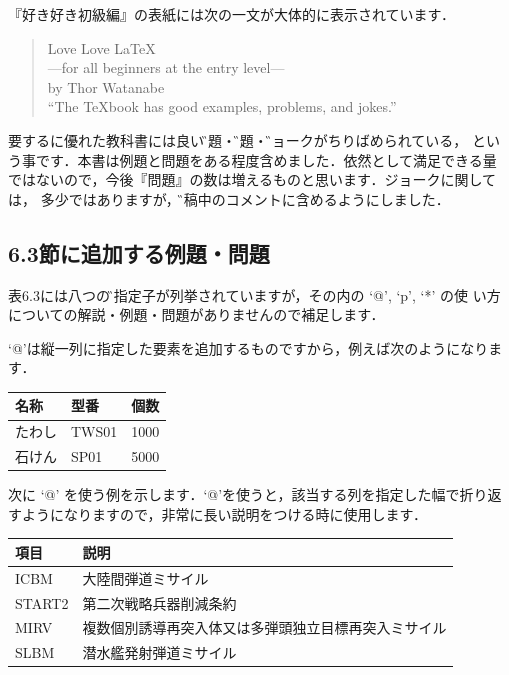 『好き好き\LaTeXe 初級編』の表紙には次の一文が大体的に表示されています．
\begin{quote}
\begin{center}
\begin{em}
 Love Love \LaTeX\\
 ---for all beginners at the entry level---\\
 by Thor Watanabe\\
 ``The \TeX book has good examples, problems, and jokes.''
\end{em}
\end{center}
\end{quote}
要するに優れた教科書には良い\G{例題}・\G{問題}・\G{ジョーク}がちりばめられている，
という事です．本書は例題と問題をある程度含めました．依然として満足できる量
ではないので，今後『問題』の数は増えるものと思います．ジョークに関しては，
多少ではありますが，\G{原稿中のコメント}に含めるようにしました．

\subsection{6.3節に追加する例題・問題}
表6.3には八つの\G{列指定子}が列挙されていますが，その内の `@', `p', `*' の使
い方についての解説・例題・問題がありませんので補足します．

`@'は縦一列に指定した要素を追加するものですから，例えば次のようになりま
す．

\begin{example}
 \begin{tabular}{lll@{\,個}}
  \hline
  名称   & 型番 & \multicolumn{1}{l}{個数}\\
  \hline
  たわし & TWS01 & 1000\\
  石けん & SP01  & 5000\\
  \hline
 \end{tabular}
\end{example}

次に `@' を使う例を示します．`@'を使うと，該当する列を指定した幅で折り返
すようになりますので，非常に長い説明をつける時に使用します．

\begin{example}
 \begin{tabular}{lp{}}
  \hline
  項目 & 説明\\
  \hline
  ICBM   & 大陸間弾道ミサイル\\
  START2 & 第二次戦略兵器削減条約\\
  MIRV   & 複数個別誘導再突入体又は多弾頭独立目標再突入ミサイル\\
  SLBM   & 潜水艦発射弾道ミサイル\\
  \hline
 \end{tabular}
\end{example}

